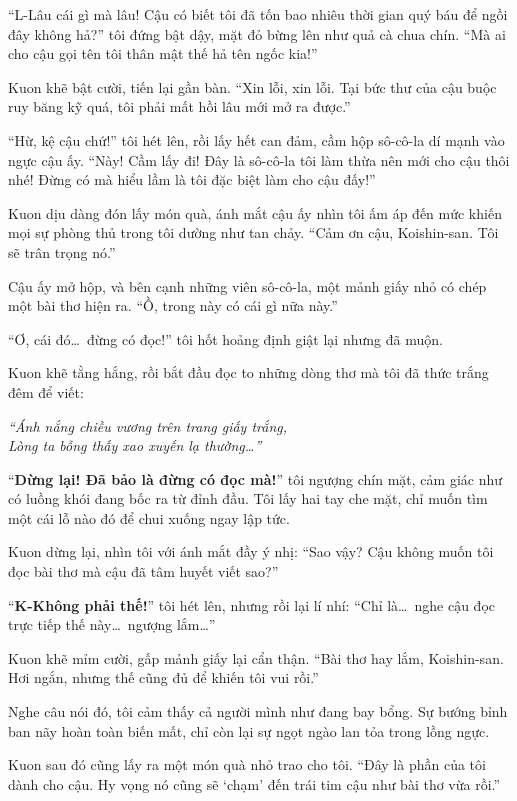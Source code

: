 \documentclass[../main.tex]{subfiles}
\begin{document}
``L-Lâu cái gì mà lâu! Cậu có biết tôi đã tốn bao nhiêu thời gian quý báu để ngồi đây không hả?'' tôi đứng bật dậy, mặt đỏ bừng lên như quả cà chua chín. ``Mà ai cho cậu gọi tên tôi thân mật thế hả tên ngốc kia!''

Kuon khẽ bật cười, tiến lại gần bàn. ``Xin lỗi, xin lỗi. Tại bức thư của cậu buộc ruy băng kỹ quá, tôi phải mất hồi lâu mới mở ra được.''

``Hừ, kệ cậu chứ!'' tôi hét lên, rồi lấy hết can đảm, cầm hộp sô-cô-la dí mạnh vào ngực cậu ấy. ``Này! Cầm lấy đi! Đây là sô-cô-la tôi làm thừa nên mới cho cậu thôi nhé! Đừng có mà hiểu lầm là tôi đặc biệt làm cho cậu đấy!''

Kuon dịu dàng đón lấy món quà, ánh mắt cậu ấy nhìn tôi ấm áp đến mức khiến mọi sự phòng thủ trong tôi dường như tan chảy. ``Cảm ơn cậu, Koishin-san. Tôi sẽ trân trọng nó.''

Cậu ấy mở hộp, và bên cạnh những viên sô-cô-la, một mảnh giấy nhỏ có chép một bài thơ hiện ra. ``Ồ, trong này có cái gì nữa này.''

``Ơ, cái đó\dots\ đừng có đọc!'' tôi hốt hoảng định giật lại nhưng đã muộn.

Kuon khẽ tằng hắng, rồi bắt đầu đọc to những dòng thơ mà tôi đã thức trắng đêm để viết:

\begin{center}
  \textit{``Ánh nắng chiều vương trên trang giấy trắng,\\
    Lòng ta bỗng thấy xao xuyến lạ thường\dots''}
\end{center}

``\textbf{Dừng lại! Đã bảo là đừng có đọc mà!}'' tôi ngượng chín mặt, cảm giác như có luồng khói đang bốc ra từ đỉnh đầu. Tôi lấy hai tay che mặt, chỉ muốn tìm một cái lỗ nào đó để chui xuống ngay lập tức.

Kuon dừng lại, nhìn tôi với ánh mắt đầy ý nhị: ``Sao vậy? Cậu không muốn tôi đọc bài thơ mà cậu đã tâm huyết viết sao?''

``\textbf{K-Không phải thế!}'' tôi hét lên, nhưng rồi lại lí nhí: ``Chỉ là\dots\ nghe cậu đọc trực tiếp thế này\dots\ ngượng lắm\dots''

Kuon khẽ mỉm cười, gấp mảnh giấy lại cẩn thận. ``Bài thơ hay lắm, Koishin-san. Hơi ngắn, nhưng thế cũng đủ để khiến tôi vui rồi.''

Nghe câu nói đó, tôi cảm thấy cả người mình như đang bay bổng. Sự bướng bỉnh ban nãy hoàn toàn biến mất, chỉ còn lại sự ngọt ngào lan tỏa trong lồng ngực.

Kuon sau đó cũng lấy ra một món quà nhỏ trao cho tôi. ``Đây là phần của tôi dành cho cậu. Hy vọng nó cũng sẽ `chạm' đến trái tim cậu như bài thơ vừa rồi.''
\end{document}
